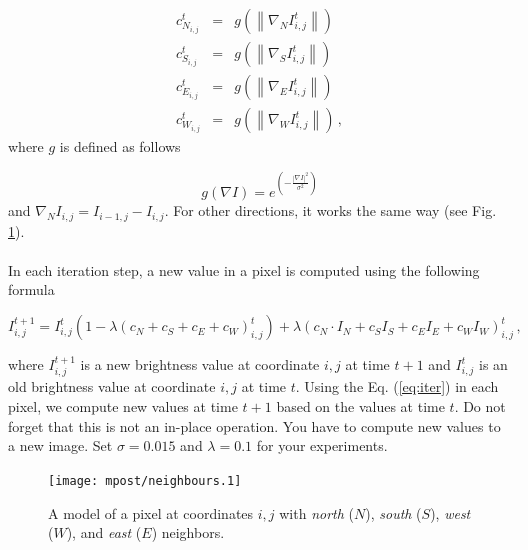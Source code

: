 \documentclass[12pt]{article}
\begin{document}
\begin{eqnarray} \label{eq:conduct}
    c_{N_{i,j}}^{t} &=& g \left(\left\|\nabla_N I_{i,j}^{t}\right\|\right) \nonumber \\
    c_{S_{i,j}}^{t} &=& g \left(\left\|\nabla_S I_{i,j}^{t}\right\|\right) \nonumber \\
    c_{E_{i,j}}^{t} &=& g \left(\left\|\nabla_E I_{i,j}^{t}\right\|\right) \nonumber \\
    c_{W_{i,j}}^{t} &=& g \left(\left\|\nabla_W I_{i,j}^{t}\right\|\right) \, ,
\end{eqnarray}
where $g$ is defined as follows

\begin{equation}
    g(\nabla I) = e^{\left(-\frac{\left| \nabla I\right|^2}{\sigma^2}\right)}
\end{equation}
and $\nabla_N I_{i,j} = I_{i-1,j} - I_{i,j}$. For other directions, it works the same way (see Fig. \ref{fig:neighborhood}).
\\
\\
\noindent
In each iteration step, a new value in a pixel is computed using the following formula

\begin{equation} \label{eq:iter}
    I_{i,j}^{t+1} = I_{i,j}^{t} \left( 1 - \lambda \left( c_N + c_S + c_E + c_W \right)_{i,j}^{t}\right) + \lambda \left( c_N \cdot I_N + c_S I_S + c_E I_E + c_W I_W \right)_{i,j}^{t} \, ,
\end{equation}


where $I_{i,j}^{t+1}$ is a new brightness value at coordinate $i,j$ at time $t+1$ and $I_{i,j}^t$ is an old brightness
value at coordinate $i,j$ at time $t$. Using the Eq. (\ref{eq:iter}) in each pixel, we compute new values at time $t+1$
based on the values at time $t$. Do not forget that this is not an in-place operation. You have to compute new values
to a new image.
\newline
\newline
Set $\sigma = 0.015$ and $\lambda = 0.1$ for your experiments.
\newline
\begin{figure}
    \centering
    \texttt{[image: mpost/neighbours.1]}
    \caption{A model of a pixel at coordinates $i,j$ with \textit{north} ($N$), \textit{south} ($S$), \textit{west} ($W$),
    and \textit{east} ($E$) neighbors.}
    \label{fig:neighborhood}
\end{figure}
\end{document}
